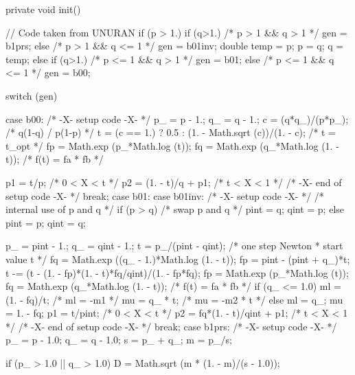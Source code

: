 \begin{code}
\begin{hide}
   private void init() {
      // Code taken from UNURAN
      if (p > 1.) {
         if (q>1.)    /* p > 1 && q > 1 */
            gen = b1prs;
         else {        /* p > 1 && q <= 1 */
            gen = b01inv;
            double temp = p;
            p = q;
            q = temp;
         }
      }
      else {
         if (q>1.)    /* p <= 1 && q > 1 */
            gen = b01;
         else         /* p <= 1 && q <= 1 */
            gen = b00;
      }

      switch (gen) {
      case b00:
         /* -X- setup code -X- */
         p_ = p - 1.;
         q_ = q - 1.;
         c = (q*q_)/(p*p_);                              /* q(1-q) / p(1-p) */
         t = (c == 1.) ? 0.5 : (1. - Math.sqrt (c))/(1. - c);  /* t = t_opt */
         fp = Math.exp (p_*Math.log (t));
         fq = Math.exp (q_*Math.log (1. - t));      /* f(t) = fa * fb  */
  
         p1 = t/p;                                  /* 0 < X < t       */
         p2 = (1. - t)/q + p1;                    /* t < X < 1       */
         /* -X- end of setup code -X- */
         break;
      case b01:
      case b01inv:
         /* -X- setup code -X- */
         /* internal use of p and q */
         if (p > q) {
            /* swap p and q */
            pint = q;
            qint = p;
         }
         else {
            pint = p;
            qint = q;
         }

         p_ = pint - 1.;
         q_ = qint - 1.;
         t = p_/(pint - qint);        /* one step Newton * start value t   */
         fq = Math.exp ((q_ - 1.)*Math.log (1. - t));
         fp = pint - (pint + q_)*t;
         t -= (t - (1. - fp)*(1. - t)*fq/qint)/(1. - fp*fq);
         fp = Math.exp (p_*Math.log (t));
         fq = Math.exp (q_*Math.log (1. - t));     /* f(t) = fa * fb  */
         if (q_ <= 1.0) {
            ml = (1. - fq)/t;                      /*   ml = -m1      */
            mu = q_ * t;                          /*   mu = -m2 * t  */
         }
         else {
            ml = q_;
            mu = 1. - fq;
         }
         p1 = t/pint;                             /*  0 < X < t      */
         p2 = fq*(1. - t)/qint + p1;              /*  t < X < 1      */
         /* -X- end of setup code -X- */
         break;
      case b1prs:
         /* -X- setup code -X- */
         p_ = p - 1.0;
         q_ = q - 1.0;
         s = p_ + q_;
         m = p_/s;

         if (p_ > 1.0 || q_ > 1.0)
            D = Math.sqrt (m * (1. - m)/(s - 1.0));

}}
\end{hide}
\end{code}
